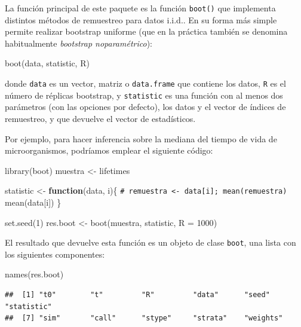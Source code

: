 \documentclass[
]{book}
\newenvironment{Shaded}{\begin{snugshade}}{\end{snugshade}}
\newcommand{\AttributeTok}[1]{\textcolor[rgb]{0.77,0.63,0.00}{#1}}
\newcommand{\CommentTok}[1]{\textcolor[rgb]{0.56,0.35,0.01}{\textit{#1}}}
\newcommand{\ControlFlowTok}[1]{\textcolor[rgb]{0.13,0.29,0.53}{\textbf{#1}}}
\newcommand{\DecValTok}[1]{\textcolor[rgb]{0.00,0.00,0.81}{#1}}
\newcommand{\FunctionTok}[1]{\textcolor[rgb]{0.00,0.00,0.00}{#1}}
\newcommand{\NormalTok}[1]{#1}
\newcommand{\OtherTok}[1]{\textcolor[rgb]{0.56,0.35,0.01}{#1}}
\theoremstyle{break}
\theoremstyle{nonumberplain}
\renewcommand{\CommentTok}[1]{\textcolor[rgb]{0.41,0.41,0.41}{\texttt{#1}}}
\begin{document}
La función principal de este paquete es la función \texttt{boot()} que implementa distintos métodos de remuestreo para datos i.i.d..
En su forma más simple permite realizar bootstrap uniforme (que en la práctica también se denomina habitualmente \emph{bootstrap noparamétrico}):

\begin{Shaded}
\begin{Highlighting}[]
\FunctionTok{boot}\NormalTok{(data, statistic, R)}
\end{Highlighting}
\end{Shaded}

donde \texttt{data} es un vector, matriz o \texttt{data.frame} que contiene los datos,
\texttt{R} es el número de réplicas bootstrap, y \texttt{statistic} es una función
con al menos dos parámetros (con las opciones por defecto),
los datos y el vector de índices de remuestreo,
y que devuelve el vector de estadísticos.

Por ejemplo, para hacer inferencia sobre la mediana del tiempo de vida de microorganismos,
podríamos emplear el siguiente código:

\begin{Shaded}
\begin{Highlighting}[]
\FunctionTok{library}\NormalTok{(boot)}
\NormalTok{muestra }\OtherTok{\textless{}{-}}\NormalTok{ lifetimes}

\NormalTok{statistic }\OtherTok{\textless{}{-}} \ControlFlowTok{function}\NormalTok{(data, i)\{}
  \CommentTok{\# remuestra \textless{}{-} data[i]; mean(remuestra)}
  \FunctionTok{mean}\NormalTok{(data[i])}
\NormalTok{\}}

\FunctionTok{set.seed}\NormalTok{(}\DecValTok{1}\NormalTok{)}
\NormalTok{res.boot }\OtherTok{\textless{}{-}} \FunctionTok{boot}\NormalTok{(muestra, statistic, }\AttributeTok{R =} \DecValTok{1000}\NormalTok{)}
\end{Highlighting}
\end{Shaded}

El resultado que devuelve esta función es un objeto de clase \texttt{boot}, una lista con los siguientes componentes:

\begin{Shaded}
\begin{Highlighting}[]
\FunctionTok{names}\NormalTok{(res.boot)}
\end{Highlighting}
\end{Shaded}

\begin{verbatim}
##  [1] "t0"        "t"         "R"         "data"      "seed"      "statistic"
##  [7] "sim"       "call"      "stype"     "strata"    "weights"
\end{verbatim}
\end{document}
